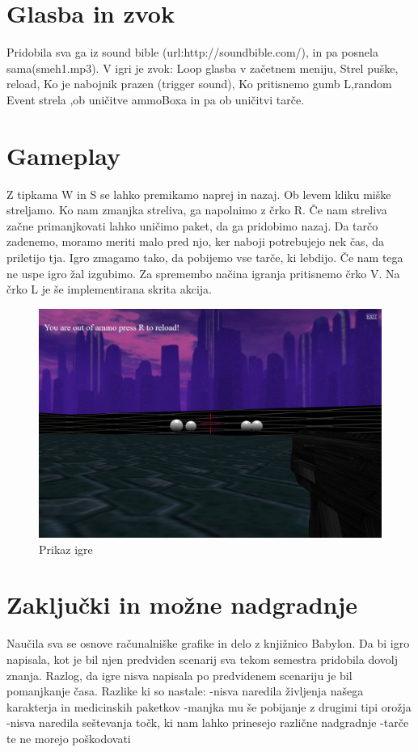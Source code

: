 \documentclass[a4paper]{article}
\begin{document}
\section{Glasba in zvok}
 Pridobila sva ga iz sound bible (url:http://soundbible.com/), in pa posnela sama(smeh1.mp3).
V igri je zvok: Loop glasba v začetnem meniju, Strel puške, reload, Ko je nabojnik prazen (trigger sound), Ko pritisnemo gumb L,random Event strela ,ob uničitve ammoBoxa in pa ob uničitvi tarče. 
 

\section{Gameplay}
Z tipkama W in S se lahko premikamo naprej in nazaj. Ob levem kliku miške streljamo. Ko nam zmanjka streliva, ga napolnimo z črko R.
Če nam streliva začne primanjkovati lahko uničimo paket, da ga pridobimo nazaj. Da tarčo zadenemo, moramo meriti malo pred njo, ker naboji potrebujejo nek čas,
da priletijo tja. Igro zmagamo tako, da pobijemo vse tarče, ki lebdijo. Če nam tega ne uspe igro žal izgubimo.
Za spremembo načina igranja pritisnemo črko V. Na črko L je še implementirana skrita akcija.

\begin{figure}[!htb]
    \begin{center}
        \includegraphics[width=\columnwidth]{slika1.png}
        \caption{Prikaz igre} \label{fig:slika1}
    \end{center}
\end{figure}



\section{Zaključki in možne nadgradnje}
Naučila sva se osnove računalniške grafike in delo z knjižnico Babylon. Da bi igro napisala, kot je bil njen predviden scenarij sva tekom semestra pridobila dovolj znanja.
Razlog, da igre nisva napisala po predvidenem scenariju je bil pomanjkanje časa.
Razlike ki so nastale:
-nisva naredila življenja našega karakterja in medicinskih paketkov
-manjka mu še pobijanje z drugimi tipi orožja
-nisva naredila seštevanja točk, ki nam lahko prinesejo različne nadgradnje
-tarče te ne morejo poškodovati



\small


\end{document}
